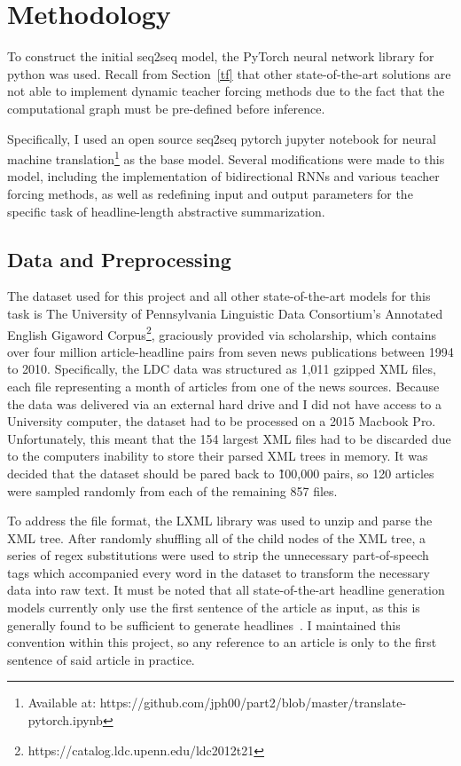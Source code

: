 \section{Methodology}\label{methodology}

To construct the initial seq2seq model, the PyTorch neural network library for python was used. Recall from Section~\ref{tf} that other state-of-the-art solutions are not able to implement dynamic teacher forcing methods due to the fact that the computational graph must be pre-defined before inference. 

Specifically, I used an open source seq2seq pytorch jupyter notebook for neural machine translation\footnote{Available at: https://github.com/jph00/part2/blob/master/translate-pytorch.ipynb} as the base model. Several modifications were made to this model, including the implementation of bidirectional RNNs and various teacher forcing methods, as well as redefining input and output parameters for the specific task of headline-length abstractive summarization.

\subsection{Data and Preprocessing}
The dataset used for this project and all other state-of-the-art models for this task is The University of Pennsylvania Linguistic Data Consortium's Annotated English Gigaword Corpus\footnote{https://catalog.ldc.upenn.edu/ldc2012t21}, graciously provided via scholarship, which contains over four million article-headline pairs from seven news publications between 1994 to 2010. Specifically, the LDC data was structured as 1,011 gzipped XML files, each file representing a month of articles from one of the news sources. Because the data was delivered via an external hard drive and I did not have access to a University computer, the dataset had to be processed on a 2015 Macbook Pro. Unfortunately, this meant that the 154 largest XML files had to be discarded due to the computers inability to store their parsed XML trees in memory. It was decided that the dataset should be pared back to \~100,000 pairs, so 120 articles were sampled randomly from each of the remaining 857 files.

To address the file format, the LXML library was used to unzip and parse the XML tree. After randomly shuffling all of the child nodes of the XML tree, a series of regex substitutions were used to strip the unnecessary part-of-speech tags which accompanied every word in the dataset to transform the necessary data into raw text. It must be noted that all state-of-the-art headline generation models currently only use the first sentence of the article as input, as this is generally found to be sufficient to generate headlines~\cite{Liu2016}. I maintained this convention within this project, so any reference to an article is only to the first sentence of said article in practice.

